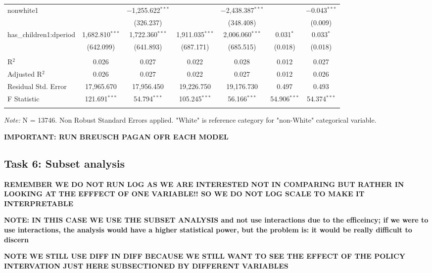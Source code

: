 \documentclass[a4paper]{article}
\begin{document}
\begin{table}[!htbp]
\begin{adjustwidth}{0.cm}{-0cm}
\begin{threeparttable}
\begin{tabular}{@{\extracolsep{-2pt}}lcccccc}
  nonwhite1 &  & $-$1,255.622$^{***}$ &  & $-$2,438.387$^{***}$ &  & $-$0.043$^{***}$ \\ 
  &  & (326.237) &  & (348.408) &  & (0.009) \\ 
  has\_children1:dperiod & 1,682.810$^{***}$ & 1,722.360$^{***}$ & 1,911.035$^{***}$ & 2,006.060$^{***}$ & 0.031$^{*}$ & 0.033$^{*}$ \\ 
  & (642.099) & (641.893) & (687.171) & (685.515) & (0.018) & (0.018) \\ 
 \hline \\[-1.8ex] 
R$^{2}$ & 0.026 & 0.027 & 0.022 & 0.028 & 0.012 & 0.027 \\ 
Adjusted R$^{2}$ & 0.026 & 0.027 & 0.022 & 0.027 & 0.012 & 0.026 \\ 
Residual Std. Error & 17,965.670 & 17,956.450  & 19,226.750  & 19,176.730 & 0.497  & 0.493  \\ 
F Statistic & 121.691$^{***}$ & 54.794$^{***}$ & 105.245$^{***}$ & 56.166$^{***}$  & 54.906$^{***}$  & 54.374$^{***}$  \\ 
\hline 
\hline \\[-3.5ex] 
\end{tabular} 
\begin{tablenotes}
      \small
      \item\textit{Note:} N = 13746. Non Robust Standard Errors applied. "White" is reference category for "non-White" categorical variable.
    \end{tablenotes}
\end{threeparttable}
\end{adjustwidth}
%
\end{table}


\textbf{IMPORTANT: RUN BREUSCH PAGAN OFR EACH MODEL}


\subsection{Task 6: Subset analysis}

\textbf{REMEMBER WE DO NOT RUN LOG AS WE ARE INTERESTED NOT IN COMPARING BUT RATHER IN LOOKING AT THE EFFFECT OF ONE VARIABLE!! SO WE DO NOT LOG SCALE TO MAKE IT INTERPRETABLE}

\textbf{NOTE: IN THIS CASE WE USE THE SUBSET ANALYSIS and not use interactions due to the efficeincy; if we were to use interactions, the analysis would have a higher statistical power, but the problem is: it would be really difficult to discern }

\textbf{NOTE WE STILL USE DIFF IN DIFF BECAUSE WE STILL WANT TO SEE THE EFFECT OF THE POLICY INTERVATION JUST HERE SUBSECTIONED BY DIFFERENT VARIABLES }
\end{document}
